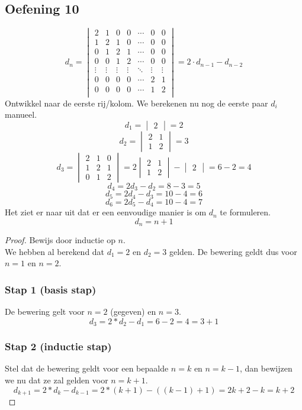 \documentclass[lineaire_algebra_oplossingen.tex]{subfiles}
\begin{document}
\subsection{Oefening 10}
\[
d_n =
\begin{vmatrix}
2 & 1 & 0 & 0 & \cdots & 0 & 0 \\
1 & 2 & 1 & 0 & \cdots & 0 & 0 \\
0 & 1 & 2 & 1 & \cdots & 0 & 0 \\
0 & 0 & 1 & 2 & \cdots & 0 & 0 \\
\vdots & \vdots & \vdots & \vdots & \ddots & \vdots & \vdots\\
0 & 0 & 0 & 0 & \cdots & 2 & 1 \\
0 & 0 & 0 & 0 & \cdots & 1 & 2 \\
\end{vmatrix}
=
2 \cdot d_{n-1} - d_{n-2}
\]
Ontwikkel naar de eerste rij/kolom.
We berekenen nu nog de eerste paar $d_i$ manueel.
\[
d_1
=
\begin{vmatrix}
2
\end{vmatrix} = 2
\]
\[
d_2
=
\begin{vmatrix}
2 & 1\\
1 & 2
\end{vmatrix} = 3
\]
\[
d_3
=
\begin{vmatrix}
2 & 1 & 0\\
1 & 2 & 1\\
0 & 1 & 2
\end{vmatrix}
= 2 
\begin{vmatrix}
2 & 1\\
1 & 2
\end{vmatrix}
-
\begin{vmatrix}
2
\end{vmatrix}
=
6 - 2 = 4
\]
\[
d_4 = 2 d_3 - d_2 = 8 - 3 = 5
\]
\[
d_5 = 2 d_4 - d_3 = 10-4 = 6
\]
\[
d_6 = 2 d_5 - d_4 = 10-4 = 7
\]
Het ziet er naar uit dat er een eenvoudige manier is om $d_n$ te formuleren.
\[
d_n = n+1
\]
\begin{proof}
Bewijs door inductie op $n$.\\
We hebben al berekend dat $d_1 = 2$ en $d_2 =3$ gelden. De bewering geldt dus voor $n=1$ en $n=2$.
\subsubsection*{Stap 1 (basis stap)}
De bewering gelt voor $n=2$ (gegeven) en $n=3$.
\[
d_3 = 2*d_2 - d_1 = 6 - 2 = 4 = 3+1
\]
\subsubsection*{Stap 2 (inductie stap)}
Stel dat de bewering geldt voor een bepaalde $n=k$ en $n=k-1$, dan bewijzen we nu dat ze zal gelden voor $n=k+1$.
\[
d_{k+1} = 2* d_{k} - d_{k-1} = 2*(k+1) - ((k-1)+1) = 2k+2-k = k+2
\]
\end{proof}
\end{document}

